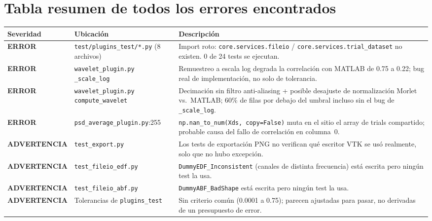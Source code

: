 \documentclass[11pt,a4paper]{article}
\newcommand{\errmark}{\textcolor{critico}{\textbf{ERROR}}}
\newcommand{\warnmark}{\textcolor{advertencia}{\textbf{ADVERTENCIA}}}
\begin{document}
\newpage
\section{Tabla resumen de todos los errores encontrados}

\begin{center}
\begin{longtable}{L{1.6cm}L{4.3cm}L{8.3cm}}
\toprule
\textbf{Severidad} & \textbf{Ubicación} & \textbf{Descripción} \\
\midrule
\endhead
\errmark & \texttt{test/plugins\_\allowbreak test/*.py} (8 archivos) & Import roto: \texttt{core.services.fileio} / \texttt{core.services.trial\_\allowbreak dataset} no existen. 0 de 24 tests se ejecutan. \\
\errmark & \texttt{wavelet\_\allowbreak plugin.py} \texttt{\_\allowbreak scale\_\allowbreak log} & Remuestreo a escala log degrada la correlación con MATLAB de 0.75 a 0.22; bug real de implementación, no solo de tolerancia. \\
\errmark & \texttt{wavelet\_\allowbreak plugin.py} \texttt{compute\_\allowbreak wavelet} & Decimación sin filtro anti-aliasing + posible desajuste de normalización Morlet vs.\ MATLAB; 60\% de filas por debajo del umbral incluso sin el bug de \texttt{\_\allowbreak scale\_\allowbreak log}. \\
\errmark & \texttt{psd\_\allowbreak average\_\allowbreak plugin.py}:255 & \texttt{np.nan\_\allowbreak to\_\allowbreak num(Xds, copy=False)} muta en el sitio el array de trials compartido; probable causa del fallo de correlación en columna~0. \\
\warnmark & \texttt{test\_\allowbreak export.py} & Los tests de exportación PNG no verifican qué escritor VTK se usó realmente, solo que no hubo excepción. \\
\warnmark & \texttt{test\_\allowbreak fileio\_\allowbreak edf.py} & \texttt{DummyEDF\_\allowbreak Inconsistent} (canales de distinta frecuencia) está escrita pero ningún test la usa. \\
\warnmark & \texttt{test\_\allowbreak fileio\_\allowbreak abf.py} & \texttt{DummyABF\_\allowbreak BadShape} está escrita pero ningún test la usa. \\
\warnmark & Tolerancias de \texttt{plugins\_\allowbreak test} & Sin criterio común (0.0001 a 0.75); parecen ajustadas para pasar, no derivadas de un presupuesto de error. \\

\end{longtable}
\end{center}
\end{document}
